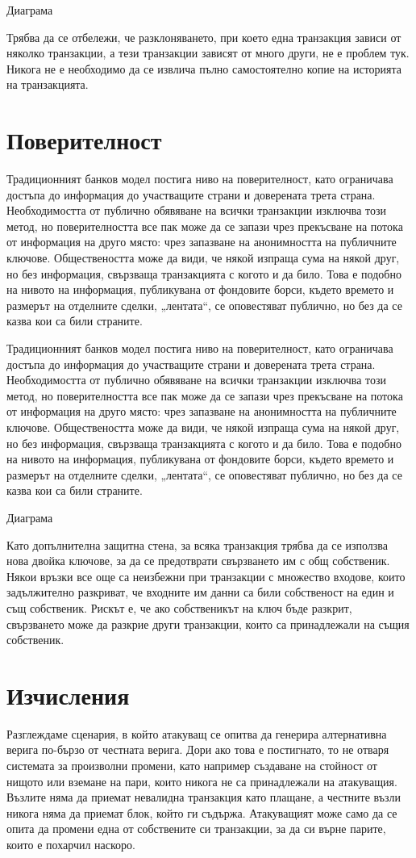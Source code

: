 \documentclass[11pt,a4paper]{article}
\begin{document}
Диаграма

Трябва да се отбележи, че разклоняването, при което една транзакция зависи от няколко транзакции, а тези транзакции зависят от много други, не е проблем тук. Никога не е необходимо да се извлича пълно самостоятелно копие на историята на транзакцията.

\section{Поверителност}
Традиционният банков модел постига ниво на поверителност, като ограничава достъпа до информация до участващите страни и доверената трета страна. Необходимостта от публично обявяване на всички транзакции изключва този метод, но поверителността все пак може да се запази чрез прекъсване на потока от информация на друго място: чрез запазване на анонимността на публичните ключове. Обществеността може да види, че някой изпраща сума на някой друг, но без информация, свързваща транзакцията с когото и да било. Това е подобно на нивото на информация, публикувана от фондовите борси, където времето и размерът на отделните сделки, „лентата“, се оповестяват публично, но без да се казва кои са били страните.

Традиционният банков модел постига ниво на поверителност, като ограничава достъпа до информация до участващите страни и доверената трета страна. Необходимостта от публично обявяване на всички транзакции изключва този метод, но поверителността все пак може да се запази чрез прекъсване на потока от информация на друго място: чрез запазване на анонимността на публичните ключове. Обществеността може да види, че някой изпраща сума на някой друг, но без информация, свързваща транзакцията с когото и да било. Това е подобно на нивото на информация, публикувана от фондовите борси, където времето и размерът на отделните сделки, „лентата“, се оповестяват публично, но без да се казва кои са били страните.

Диаграма

Като допълнителна защитна стена, за всяка транзакция трябва да се използва нова двойка ключове, за да се предотврати свързването им с общ собственик. Някои връзки все още са неизбежни при транзакции с множество входове, които задължително разкриват, че входните им данни са били собственост на един и същ собственик. Рискът е, че ако собственикът на ключ бъде разкрит, свързването може да разкрие други транзакции, които са принадлежали на същия собственик.

\section{Изчисления}
Разглеждаме сценария, в който атакуващ се опитва да генерира алтернативна верига по-бързо от честната верига. Дори ако това е постигнато, то не отваря системата за произволни промени, като например създаване на стойност от нищото или вземане на пари, които никога не са принадлежали на атакуващия. Възлите няма да приемат невалидна транзакция като плащане, а честните възли никога няма да приемат блок, който ги съдържа. Атакуващият може само да се опита да промени една от собствените си транзакции, за да си върне парите, които е похарчил наскоро.
\end{document}
